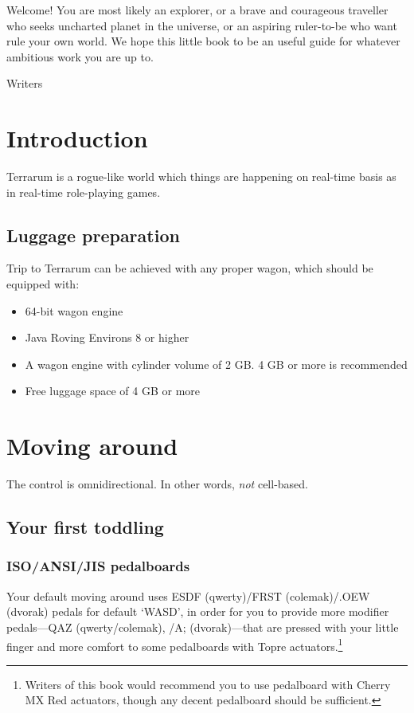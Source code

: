 \documentclass[stock,9pt,nohan]{oblivoir}
\title{\titleEN}
\author{\authorEN}
\date{\dateEN}
\begin{document}
\maketitle

\newpage

\epigraph{
Welcome! You are most likely an explorer, or a brave and courageous traveller who seeks uncharted planet in the universe, or an aspiring ruler-to-be who want rule your own world. We hope this little book to be an useful guide for whatever ambitious work you are up to.
}{Writers}

\tableofcontents*

\newpage

\newpage

\section{Introduction}
Terrarum is a rogue-like world which things are happening on real-time basis as in real-time role-playing games.

	\subsection{Luggage preparation}
	Trip to Terrarum can be achieved with any proper wagon, which should be equipped with:
	\begin{itemize}
	\item 64-bit wagon engine
	\item Java Roving Environs 8 or higher
	\item A wagon engine with cylinder volume of 2 GB. 4 GB or more is recommended
	\item Free luggage space of 4 GB or more
	\end{itemize}

\section{Moving around}
The control is omnidirectional. In other words, \emph{not} cell-based.

	\subsection{Your first toddling}
	\subsubsection{ISO\slash ANSI\slash JIS pedalboards}
	Your default moving around uses ESDF (qwerty)\slash FRST (colemak)\slash .OEW (dvorak) pedals for default `WASD', in order for you to provide more modifier pedals---QAZ (qwerty\slash colemak), /A; (dvorak)---that are pressed with your little finger and more comfort to some pedalboards with Topre actuators.\footnote{Writers of this book would recommend you to use pedalboard with Cherry MX Red actuators, though any decent pedalboard should be sufficient.}
	
\end{document}
